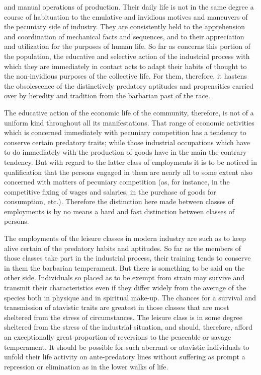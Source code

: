 \documentclass[12pt]{report}
\begin{document}
and manual operations of production. Their daily life is not in the same
degree a course of habituation to the emulative and invidious motives
and maneuvers of the pecuniary side of industry. They are consistently
held to the apprehension and coordination of mechanical facts and
sequences, and to their appreciation and utilization for the purposes
of human life. So far as concerns this portion of the population, the
educative and selective action of the industrial process with which they
are immediately in contact acts to adapt their habits of thought to the
non-invidious purposes of the collective life. For them, therefore, it
hastens the obsolescence of the distinctively predatory aptitudes and
propensities carried over by heredity and tradition from the barbarian
past of the race.

The educative action of the economic life of the community, therefore,
is not of a uniform kind throughout all its manifestations. That range
of economic activities which is concerned immediately with pecuniary
competition has a tendency to conserve certain predatory traits; while
those industrial occupations which have to do immediately with the
production of goods have in the main the contrary tendency. But with
regard to the latter class of employments it is to be noticed in
qualification that the persons engaged in them are nearly all to some
extent also concerned with matters of pecuniary competition (as, for
instance, in the competitive fixing of wages and salaries, in the
purchase of goods for consumption, etc.). Therefore the distinction
here made between classes of employments is by no means a hard and fast
distinction between classes of persons.

The employments of the leisure classes in modern industry are such as to
keep alive certain of the predatory habits and aptitudes. So far as
the members of those classes take part in the industrial process, their
training tends to conserve in them the barbarian temperament. But there
is something to be said on the other side. Individuals so placed as to
be exempt from strain may survive and transmit their characteristics
even if they differ widely from the average of the species both in
physique and in spiritual make-up. The chances for a survival and
transmission of atavistic traits are greatest in those classes that are
most sheltered from the stress of circumstances. The leisure class is in
some degree sheltered from the stress of the industrial situation,
and should, therefore, afford an exceptionally great proportion of
reversions to the peaceable or savage temperament. It should be possible
for such aberrant or atavistic individuals to unfold their life activity
on ante-predatory lines without suffering as prompt a repression or
elimination as in the lower walks of life.
\end{document}
